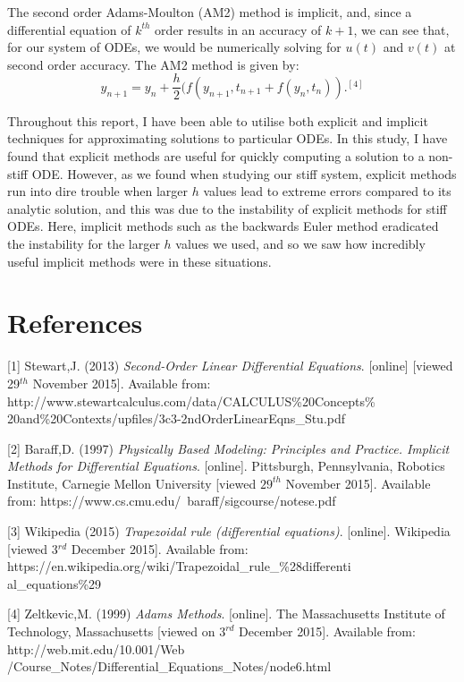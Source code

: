 \documentclass[11pt,a4paper]{article}
\begin{document}
The second order Adams-Moulton (AM2) method is implicit, and, since a differential equation of $k^{th}$ order results in an accuracy of $k+1$, we can see that, for our system of ODEs, we would be numerically solving for $u(t)$ and $v(t)$ at second order accuracy. The AM2 method is given by:
$$y_{n+1}=y_n+\frac{h}{2}(f(y_{n+1},t_{n+1}+f(y_n,t_n)).^{[4]}$$

Throughout this report, I have been able to utilise both explicit and implicit techniques for approximating solutions to particular ODEs. In this study, I have found that explicit methods are useful for quickly computing a solution to a non-stiff ODE. However, as we found when studying our stiff system, explicit methods run into dire trouble when larger $h$ values lead to extreme errors compared to its analytic solution, and this was due to the instability of explicit methods for stiff ODEs. Here, implicit methods such as the backwards Euler method eradicated the instability for the larger $h$ values we used, and so we saw how incredibly useful implicit methods were in these situations.
\clearpage
\section{References}
[1]	Stewart,J. (2013) \textit{Second-Order Linear Differential Equations}. [online] [viewed 29$^{th}$ November 2015]. Available from: http://www.stewartcalculus.com/data/CALCULUS\%20Concepts\%\\20and\%20Contexts/upfiles/3c3-2ndOrderLinearEqns\_Stu.pdf

[2]	Baraff,D. (1997) \textit{Physically Based Modeling: Principles and Practice. Implicit Methods for Differential Equations}. [online]. Pittsburgh, Pennsylvania, Robotics Institute, Carnegie Mellon University [viewed $29^{th}$ November 2015]. Available from: https://www.cs.cmu.edu/~baraff/sigcourse/notese.pdf

[3]	Wikipedia (2015) \textit{Trapezoidal rule (differential equations)}. [online]. Wikipedia [viewed 3$^{rd}$ December 2015]. Available from: https://en.wikipedia.org/wiki/Trapezoidal\_rule\_\%28differenti\\al\_equations\%29

[4]	Zeltkevic,M. (1999) \textit{Adams Methods}. [online]. The Massachusetts Institute of Technology, Massachusetts [viewed on $3^{rd}$ December 2015]. Available from: http://web.mit.edu/10.001/Web\\/Course\_Notes/Differential\_Equations\_Notes/node6.html
\end{document}
